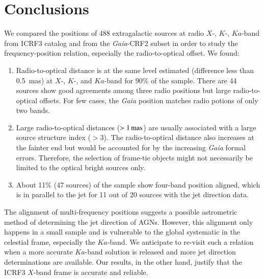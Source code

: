 \documentclass{aa}
\begin{document}

\section{Conclusions} \label{sec:conclusions}

   We compared the positions of 488 extragalactic sources at radio $X$-, $K$-, $Ka$-band from ICRF3 catalog and from the \textit{Gaia}-CRF2 subset in order to study the frequency-position relation, especially the radio-to-optical offset.
   We found:
   \begin{enumerate}
   \item Radio-to-optical distance is at the same level estimated (difference less than 0.5~mas) at $X$-, $K$-, and $Ka$-band for 90\% of the sample.
   There are 44 sources show good agreements among three radio positions but large radio-to-optical offsets.
   For few cases, the \textit{Gaia} position matches radio potions of only two bands.
   \item Large radio-to-optical distances ($>1\,{\rm mas}$) are usually associated with a large source structure index ($>3$).
   The radio-to-optical distance also increases at the fainter end but would be accounted for by the increasing \textit{Gaia} formal errors.
   Therefore, the selection of frame-tie objects might not necessarily be limited to the optical bright sources only.
   \item About 11\% (47 sources) of the sample show four-band position aligned, which is in parallel to the jet for 11 out of 20 sources with the jet direction data.
   \end{enumerate}

   The alignment of multi-frequency positions suggests a possible astrometric method of determining the jet direction of AGNs.
   However, this alignment only happens in a small sample and is vulnerable to the global systematic in the celestial frame, especially the $Ka$-band.
   We anticipate to re-visit such a relation when a more accurate $Ka$-band solution is released and more jet direction determinations are available.
   Our results, in the other hand, justify that the ICRF3 $X$-band frame is accurate and reliable.

\end{document}
